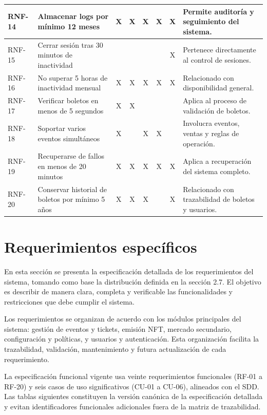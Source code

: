 \documentclass[12pt,letterpaper]{article}
\begin{document}
\begin{table}[htbp]
\begin{tabularx}{\textwidth}{|p{1.2cm}|X|c|c|c|c|c|X|}
RNF-14 & Almacenar logs por mínimo 12 meses & X & X & X & X & X & Permite auditoría y seguimiento del sistema. \\ \hline
RNF-15 & Cerrar sesión tras 30 minutos de inactividad &  &  &  &  & X & Pertenece directamente al control de sesiones. \\ \hline
RNF-16 & No superar 5 horas de inactividad mensual & X & X & X & X & X & Relacionado con disponibilidad general. \\ \hline
RNF-17 & Verificar boletos en menos de 5 segundos & X & X &  &  &  & Aplica al proceso de validación de boletos. \\ \hline
RNF-18 & Soportar varios eventos simultáneos & X &  & X & X &  & Involucra eventos, ventas y reglas de operación. \\ \hline
RNF-19 & Recuperarse de fallos en menos de 20 minutos & X & X & X & X & X & Aplica a recuperación del sistema completo. \\ \hline
RNF-20 & Conservar historial de boletos por mínimo 5 años & X & X & X &  & X & Relacionado con trazabilidad de boletos y usuarios. \\ \hline

\end{tabularx}

\normalsize
\end{table}
\clearpage
\section{Requerimientos específicos}
En esta sección se presenta la especificación detallada de los requerimientos del sistema, tomando como base la distribución definida en la sección 2.7. El objetivo es describir de manera clara, completa y verificable las funcionalidades y restricciones que debe cumplir el sistema.

Los requerimientos se organizan de acuerdo con los módulos principales del sistema: gestión de eventos y tickets, emisión NFT, mercado secundario, configuración y políticas, y usuarios y autenticación. Esta organización facilita la trazabilidad, validación, mantenimiento y futura actualización de cada requerimiento.

La especificación funcional vigente usa veinte requerimientos funcionales (RF-01 a RF-20) y seis casos de uso significativos (CU-01 a CU-06), alineados con el SDD. Las tablas siguientes constituyen la versión canónica de la especificación detallada y evitan identificadores funcionales adicionales fuera de la matriz de trazabilidad.
\end{document}
